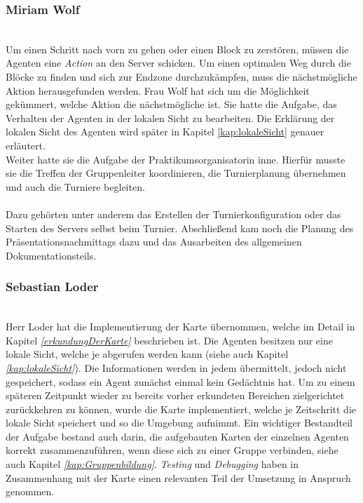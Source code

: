 \subsubsection{Miriam Wolf} ~\\
Um einen Schritt nach vorn zu gehen oder einen Block zu zerstören, müssen die Agenten eine \textit{Action} an den Server schicken. Um einen optimalen Weg durch die Blöcke zu finden und sich zur Endzone durchzukämpfen, muss die nächstmögliche Aktion herausgefunden werden. Frau Wolf hat sich um die Möglichkeit gekümmert, welche Aktion die nächstmögliche ist. Sie hatte die Aufgabe, das Verhalten der Agenten in der lokalen Sicht zu bearbeiten. Die Erklärung der lokalen Sicht des Agenten wird später in Kapitel \ref{kap:lokaleSicht} genauer erläutert. \\

Weiter hatte sie die Aufgabe der Praktikumsorganisatorin inne. Hierfür musste sie die Treffen der Gruppenleiter koordinieren, die Turnierplanung übernehmen und auch die Turniere begleiten. \\\\
Dazu gehörten unter anderem das Erstellen der Turnierkonfiguration oder das Starten des Servers selbst beim Turnier. Abschließend kam noch die Planung des Präsentationsnachmittags dazu und das Ausarbeiten des allgemeinen Dokumentationsteils.

\subsubsection{Sebastian Loder} ~\\
Herr Loder hat die Implementierung der Karte übernommen, welche im Detail in Kapitel \textit{\ref{erkundungDerKarte}} beschrieben ist. Die Agenten besitzen nur eine lokale Sicht, welche je \Percept abgerufen werden kann (siehe auch Kapitel \textit{\ref{kap:lokaleSicht}}). Die Informationen werden in jedem \Step übermittelt, jedoch nicht gespeichert, sodass ein Agent zunächst einmal kein Gedächtnis hat. Um zu einem späteren Zeitpunkt wieder zu bereits vorher erkundeten Bereichen zielgerichtet zurückkehren zu können, wurde die Karte implementiert, welche je Zeitschritt die lokale Sicht speichert und so die Umgebung aufnimmt. Ein wichtiger Bestandteil der Aufgabe bestand auch darin, die aufgebauten Karten der einzelnen Agenten korrekt zusammenzuführen, wenn diese sich zu einer Gruppe verbinden, siehe auch Kapitel \textit{\ref{kap:Gruppenbildung}}. \textit{Testing} und \textit{Debugging} haben in Zusammenhang mit der Karte einen relevanten Teil der Umsetzung in Anspruch genommen.

